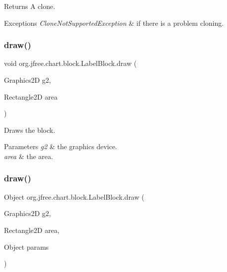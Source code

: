 \begin{DoxyReturn}{Returns}
A clone.
\end{DoxyReturn}

\begin{DoxyExceptions}{Exceptions}
{\em Clone\+Not\+Supported\+Exception} & if there is a problem cloning. \\
\hline
\end{DoxyExceptions}
\mbox{\label{classorg_1_1jfree_1_1chart_1_1block_1_1_label_block_acbc6372fee69a3d3f6023606e9a738c8}} 
\subsubsection{\texorpdfstring{draw()}{draw()}\hspace{0.1cm}{\footnotesize\ttfamily [1/2]}}
{\footnotesize\ttfamily void org.\+jfree.\+chart.\+block.\+Label\+Block.\+draw (\begin{DoxyParamCaption}\item[{Graphics2D}]{g2,  }\item[{Rectangle2D}]{area }\end{DoxyParamCaption})}

Draws the block.


\begin{DoxyParams}{Parameters}
{\em g2} & the graphics device. \\
\hline
{\em area} & the area. \\
\hline
\end{DoxyParams}
\mbox{\label{classorg_1_1jfree_1_1chart_1_1block_1_1_label_block_a37ce0083b41db3d2c02e4868476bffaa}} 
\subsubsection{\texorpdfstring{draw()}{draw()}\hspace{0.1cm}{\footnotesize\ttfamily [2/2]}}
{\footnotesize\ttfamily Object org.\+jfree.\+chart.\+block.\+Label\+Block.\+draw (\begin{DoxyParamCaption}\item[{Graphics2D}]{g2,  }\item[{Rectangle2D}]{area,  }\item[{Object}]{params }\end{DoxyParamCaption})}

